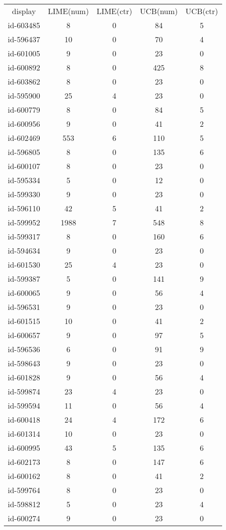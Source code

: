 \begin{tabular}{ccccc}
display & LIME(num) & LIME(ctr) & UCB(num) & UCB(ctr)\\
id-603485 & 8 & 0 & 84 & 5\\
id-596437 & 10 & 0 & 70 & 4\\
id-601005 & 9 & 0 & 23 & 0\\
id-600892 & 8 & 0 & 425 & 8\\
id-603862 & 8 & 0 & 23 & 0\\
id-595900 & 25 & 4 & 23 & 0\\
id-600779 & 8 & 0 & 84 & 5\\
id-600956 & 9 & 0 & 41 & 2\\
id-602469 & 553 & 6 & 110 & 5\\
id-596805 & 8 & 0 & 135 & 6\\
id-600107 & 8 & 0 & 23 & 0\\
id-595334 & 5 & 0 & 12 & 0\\
id-599330 & 9 & 0 & 23 & 0\\
id-596110 & 42 & 5 & 41 & 2\\
id-599952 & 1988 & 7 & 548 & 8\\
id-599317 & 8 & 0 & 160 & 6\\
id-594634 & 9 & 0 & 23 & 0\\
id-601530 & 25 & 4 & 23 & 0\\
id-599387 & 5 & 0 & 141 & 9\\
id-600065 & 9 & 0 & 56 & 4\\
id-596531 & 9 & 0 & 23 & 0\\
id-601515 & 10 & 0 & 41 & 2\\
id-600657 & 9 & 0 & 97 & 5\\
id-596536 & 6 & 0 & 91 & 9\\
id-598643 & 9 & 0 & 23 & 0\\
id-601828 & 9 & 0 & 56 & 4\\
id-599874 & 23 & 4 & 23 & 0\\
id-599594 & 11 & 0 & 56 & 4\\
id-600418 & 24 & 4 & 172 & 6\\
id-601314 & 10 & 0 & 23 & 0\\
id-600995 & 43 & 5 & 135 & 6\\
id-602173 & 8 & 0 & 147 & 6\\
id-600162 & 8 & 0 & 41 & 2\\
id-599764 & 8 & 0 & 23 & 0\\
id-598812 & 5 & 0 & 23 & 4\\
id-600274 & 9 & 0 & 23 & 0\\

\end{tabular}
